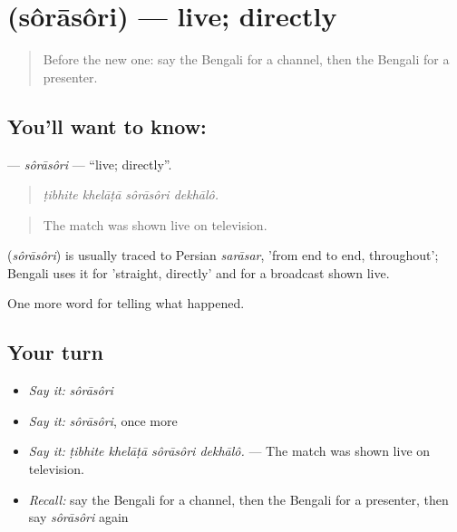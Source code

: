 \section[\texorpdfstring{\bn{সরাসরি} (sôrāsôri)}{সরাসরি (sôrāsôri)}]{ (sôrāsôri) — live; directly}

\label{lesson:BN-C299-sorasori}



\begin{quote}
Before the new one: say the Bengali for a channel, then the Bengali for a presenter.
\end{quote}

\subsection*{You'll want to know: }
\textbf{} — \emph{sôrāsôri} — \textquotedblleft{}live; directly\textquotedblright{}.

\begin{quote}
   
\end{quote}

\begin{quote}
\emph{ṭibhite khelāṭā sôrāsôri dekhālô.}
\end{quote}

\begin{quote}
The match was shown live on television.
\end{quote}

\begin{cousinweb}
\textbf{} (\emph{sôrāsôri}) is usually traced to Persian \emph{sarāsar}, 'from end to end, throughout'; Bengali uses it for 'straight, directly' and for a broadcast shown live.
\end{cousinweb}

\begin{grammarlens}[title={What you've built}]
One more word for telling what happened.
\end{grammarlens}

\subsection*{Your turn}
\begin{itemize}
\raggedright
  \item \emph{Say it:} \emph{sôrāsôri}
  \item \emph{Say it:} \emph{sôrāsôri}, once more
  \item \emph{Say it:} \emph{ṭibhite khelāṭā sôrāsôri dekhālô.} — The match was shown live on television.
  \item \emph{Recall:} say the Bengali for a channel, then the Bengali for a presenter, then say \emph{sôrāsôri} again
\end{itemize}

